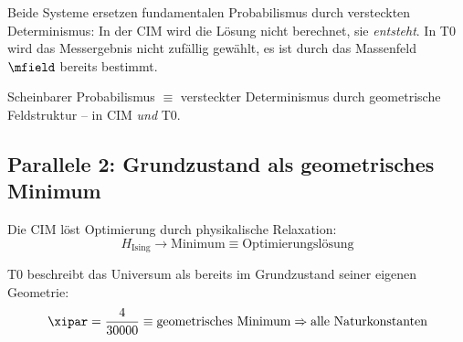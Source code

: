 \begin{table}[h]
    \centering
    \caption{Parallele 1: Determinismus}
    \label{tab:parallel1}
\end{table}

Beide Systeme ersetzen fundamentalen Probabilismus durch versteckten Determinismus:
In der CIM wird die Lösung nicht berechnet, sie \emph{entsteht}.
In T0 wird das Messergebnis nicht zufällig gewählt, es ist durch das Massenfeld 
$\mfield$ bereits bestimmt.

\begin{keyresult}[Parallele 1]
    Scheinbarer Probabilismus $\equiv$ versteckter Determinismus durch geometrische 
    Feldstruktur -- in CIM \emph{und} T0.
\end{keyresult}

\subsection{Parallele 2: Grundzustand als geometrisches Minimum}

Die CIM löst Optimierung durch physikalische Relaxation:
\begin{equation}
    H_{\text{Ising}} \rightarrow \text{Minimum} \equiv \text{Optimierungslösung}
    \label{eq:cim_groundstate}
\end{equation}

T0 beschreibt das Universum als bereits im Grundzustand seiner eigenen Geometrie:
\begin{equation}
    \xipar = \frac{4}{30000} \equiv \text{geometrisches Minimum} \Rightarrow 
    \text{alle Naturkonstanten}
    \label{eq:t0_groundstate}
\end{equation}

